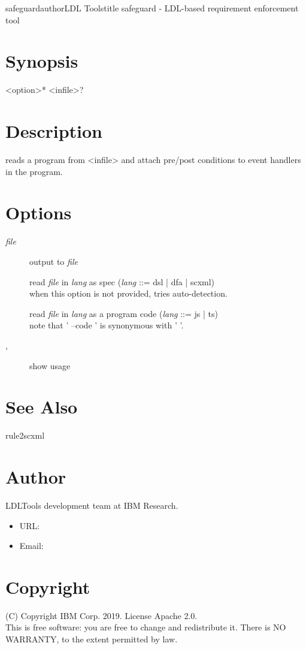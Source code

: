 \documentclass[fancy]{article}
\begin{document}
\begin{Name}{1}{safeguard}{author}{LDL Tools}{title}
safeguard - LDL-based requirement enforcement tool
\end{Name}

\section{Synopsis}
 <option>* <infile>?

\section{Description}
 reads a program from <infile>
and attach pre/post conditions to event handlers in the program.

\section{Options}

\begin{description}
\item[ \emph{file}]
  output to \emph{file}
\item[ ]
  read \emph{file} in \emph{lang} as spec (\emph{lang} ::= dsl | dfa | scxml)\\
  when this option is not provided,  tries auto-detection.
\item[ ]
  read \emph{file} in \emph{lang} as a program code (\emph{lang} ::= js | ts)\\
  note that ' --code ' is synonymous with ' '.
%
\item[, ]
  show usage

\end{description}

\section{See Also}
rule2scxml

\section{Author}
LDLTools development team at IBM Research.

\begin{itemize}
\item URL: 
\item Email: 
\end{itemize}

\section{Copyright}
(C) Copyright IBM Corp. 2019.
License Apache 2.0.\\

This is free software: you are free to change and redistribute it.
There is NO  WARRANTY,  to the extent permitted by law.
\end{document}
